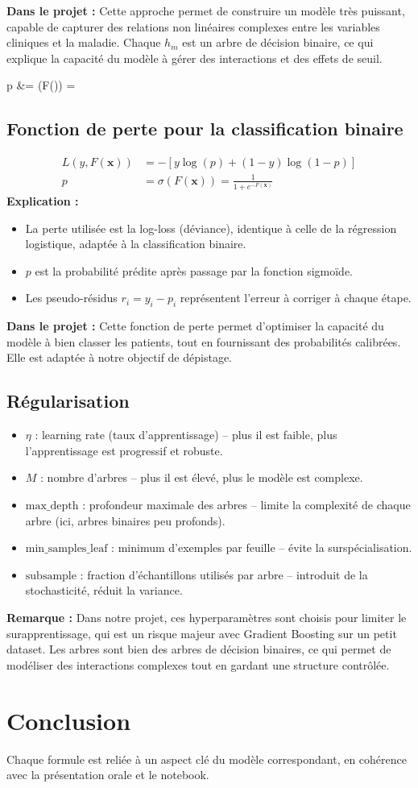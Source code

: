 \documentclass[a4paper,12pt]{article}
\begin{document}
\textbf{Dans le projet :} Cette approche permet de construire un modèle très puissant, capable de capturer des relations non linéaires complexes entre les variables cliniques et la maladie. Chaque $h_m$ est un arbre de décision binaire, ce qui explique la capacité du modèle à gérer des interactions et des effets de seuil.

p &= \sigma(F()) = 

\subsection*{Fonction de perte pour la classification binaire}
\begin{align*}
L(y, F(\mathbf{x})) &= -\left[ y \log(p) + (1-y) \log(1-p) \right] \\
p &= \sigma(F(\mathbf{x})) = \frac{1}{1 + e^{-F(\mathbf{x})}}
\end{align*}
\textbf{Explication :}
\begin{itemize}
  \item La perte utilisée est la log-loss (déviance), identique à celle de la régression logistique, adaptée à la classification binaire.
  \item $p$ est la probabilité prédite après passage par la fonction sigmoïde.
  \item Les pseudo-résidus $r_i = y_i - p_i$ représentent l'erreur à corriger à chaque étape.
\end{itemize}

\textbf{Dans le projet :} Cette fonction de perte permet d'optimiser la capacité du modèle à bien classer les patients, tout en fournissant des probabilités calibrées. Elle est adaptée à notre objectif de dépistage.


\subsection*{Régularisation}
\begin{itemize}
  \item $\eta$ : learning rate (taux d'apprentissage) -- plus il est faible, plus l'apprentissage est progressif et robuste.
  \item $M$ : nombre d'arbres -- plus il est élevé, plus le modèle est complexe.
  \item $\text{max\_depth}$ : profondeur maximale des arbres -- limite la complexité de chaque arbre (ici, arbres binaires peu profonds).
  \item $\text{min\_samples\_leaf}$ : minimum d'exemples par feuille -- évite la surspécialisation.
  \item $\text{subsample}$ : fraction d'échantillons utilisés par arbre -- introduit de la stochasticité, réduit la variance.
\end{itemize}
\textbf{Remarque :} Dans notre projet, ces hyperparamètres sont choisis pour limiter le surapprentissage, qui est un risque majeur avec Gradient Boosting sur un petit dataset. Les arbres sont bien des arbres de décision binaires, ce qui permet de modéliser des interactions complexes tout en gardant une structure contrôlée.

\section*{Conclusion}
Chaque formule est reliée à un aspect clé du modèle correspondant, en cohérence avec la présentation orale et le notebook.
\end{document}
